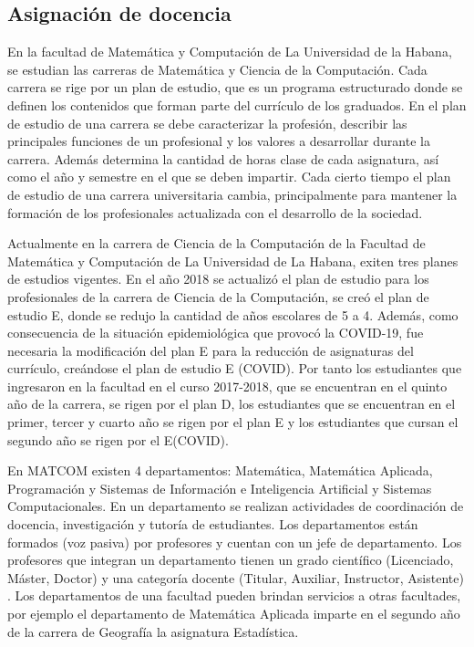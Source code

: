 \subsection{Asignación de docencia}

En la facultad de Matemática y Computación de La Universidad de la 
Habana, se estudian las carreras de Matemática y Ciencia de la Computación. 
Cada carrera se rige por un plan de estudio, que es un programa estructurado
donde se definen los contenidos que forman parte del currículo de los 
graduados. En el plan de estudio de una carrera 
se debe caracterizar la profesión, describir las principales funciones de un profesional y 
los valores a desarrollar durante la carrera. 
Además determina la cantidad de horas clase de cada asignatura,
así como el año y semestre en el que se deben impartir.
Cada cierto tiempo el plan de estudio de una carrera universitaria cambia, principalmente
para mantener la formación de los profesionales actualizada con el desarrollo de la 
sociedad.

Actualmente en la carrera de Ciencia de la 
Computación de la Facultad de Matemática 
y Computación de La Universidad de La Habana, exiten tres planes de estudios 
vigentes. En el año 2018 se actualizó el plan de estudio para los profesionales de la 
carrera de Ciencia de la Computación, se creó el plan de estudio E,
donde se redujo la cantidad de años escolares de 5 a 4. Además, como consecuencia de la situación epidemiológica que provocó la COVID-19, 
fue necesaria la modificación del plan E para la reducción de asignaturas del currículo, creándose 
el plan de estudio E (COVID). Por tanto los estudiantes que ingresaron en la facultad en 
el curso 2017-2018, que se encuentran en el quinto año de la carrera, se rigen por el plan D, 
los estudiantes que se encuentran en el primer, tercer y cuarto año se rigen por el plan E y los 
estudiantes que cursan el segundo año se rigen por el E(COVID).   



En MATCOM existen 4 departamentos: Matemática, Matemática Aplicada,
Programación y Sistemas de Información e Inteligencia 
Artificial y Sistemas Computacionales.
En un departamento se realizan actividades de coordinación de docencia, investigación y 
tutoría de estudiantes. Los departamentos están formados (voz pasiva) por profesores
y cuentan con un jefe de departamento. Los profesores que integran un departamento tienen 
un grado científico (Licenciado, Máster, Doctor) y una categoría docente (Titular, Auxiliar, Instructor, Asistente) .
Los departamentos de una 
facultad pueden brindan servicios a otras facultades, por ejemplo el departamento de 
Matemática Aplicada imparte en el segundo año de la carrera de Geografía la asignatura 
Estadística.


